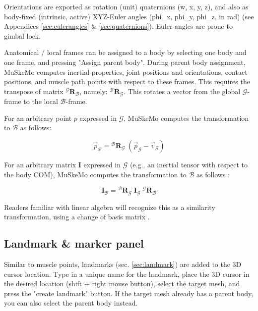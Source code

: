 \documentclass{article}
\begin{document}
Orientations are exported as rotation (unit) quaternions (w, x, y, z), and also as body-fixed (intrinsic, active) XYZ-Euler angles (phi\_x, phi\_y, phi\_z, in rad) (see Appendices \ref{sec:eulerangles} \& \ref{sec:quaternions}). Euler angles are prone to gimbal lock. 

Anatomical / local frames can be assigned to a body by selecting one body and one frame, and pressing "Assign parent body". During parent body assignment, MuSkeMo computes inertial properties, joint positions and orientations, contact positions, and muscle path points with respect to these frames. This requires the transpose of matrix \({}^{\mathcal{G}} \mathbf{R}_{\mathcal{B}}\), namely: \({}^{\mathcal{B}} \mathbf{R}_{\mathcal{G}}\). This rotates a vector from the global \(\mathcal{G}\)-frame to the local \(\mathcal{B}\)-frame.

For an arbitrary point \(p\) expressed in \(\mathcal{G}\), MuSkeMo computes the transformation to \(\mathcal{B}\) as follows: 

\begin{equation}
\vec{p}_{\mathcal{B}} = {}^{\mathcal{B}} \mathbf{R}_{\mathcal{G}} \; (\vec{p}_{\mathcal{G}} - \vec{v}_{\mathcal{G}})
\end{equation}

For an arbitrary matrix \(\mathbf{I}\) expressed in \(\mathcal{G}\) (e.g., an inertial tensor with respect to the body COM), MuSkeMo computes the transformation to \(\mathcal{B}\) as follows \cite{valleryAdvancedDynamics2019}:

\begin{equation}
\mathbf{I}_{\mathcal{B}} = {}^{\mathcal{B}} \mathbf{R}_{\mathcal{G}} \;\mathbf{I}_{\mathcal{G}} \; {}^{\mathcal{G}} \mathbf{R}_{\mathcal{B}}
\label{eq:similaritytransformation}
\end{equation}

Readers familiar with linear algebra will recognize this as a similarity transformation, using a change of basis matrix \cite{layLinearAlgebraIts2016}.

\subsection{Landmark \& marker panel}
\label{sec:landmarkpanel}

Similar to muscle points, landmarks (sec. \ref{sec:landmark}) are added to the 3D cursor location. Type in a unique name for the landmark, place the 3D cursor in the desired location (shift + right mouse button), select the target mesh, and press the "create landmark" button. If the target mesh already has a parent body, you can also select the parent body instead. 
\end{document}
